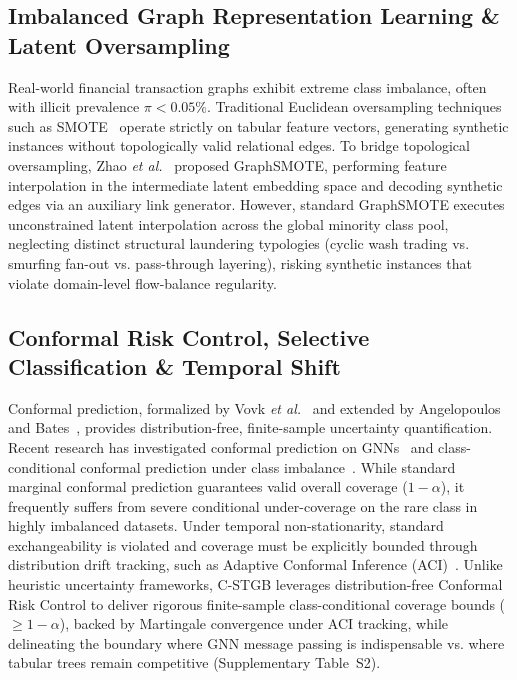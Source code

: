 \subsection{Imbalanced Graph Representation Learning \& Latent Oversampling}
Real-world financial transaction graphs exhibit extreme class imbalance, often with illicit prevalence $\pi < 0.05\%$. Traditional Euclidean oversampling techniques such as SMOTE~\cite{chawla2002smote} operate strictly on tabular feature vectors, generating synthetic instances without topologically valid relational edges. To bridge topological oversampling, Zhao \textit{et al.}~\cite{zhao2021graphsmote} proposed GraphSMOTE, performing feature interpolation in the intermediate latent embedding space and decoding synthetic edges via an auxiliary link generator. However, standard GraphSMOTE executes unconstrained latent interpolation across the global minority class pool, neglecting distinct structural laundering typologies (cyclic wash trading vs. smurfing fan-out vs. pass-through layering), risking synthetic instances that violate domain-level flow-balance regularity.

\subsection{Conformal Risk Control, Selective Classification \& Temporal Shift}
Conformal prediction, formalized by Vovk \textit{et al.}~\cite{vovk2005algorithmic} and extended by Angelopoulos and Bates~\cite{angelopoulos2021gentle, bates2021distribution}, provides distribution-free, finite-sample uncertainty quantification. Recent research has investigated conformal prediction on GNNs~\cite{huang2024conformal} and class-conditional conformal prediction under class imbalance~\cite{ding2023class}. While standard marginal conformal prediction guarantees valid overall coverage ($1-\alpha$), it frequently suffers from severe conditional under-coverage on the rare class in highly imbalanced datasets. Under temporal non-stationarity, standard exchangeability is violated and coverage must be explicitly bounded through distribution drift tracking, such as Adaptive Conformal Inference (ACI)~\cite{gibbs2021adaptive}. Unlike heuristic uncertainty frameworks, C-STGB leverages distribution-free Conformal Risk Control to deliver rigorous finite-sample class-conditional coverage bounds ($\ge 1 - \alpha$), backed by Martingale convergence under ACI tracking, while delineating the boundary where GNN message passing is indispensable vs. where tabular trees remain competitive (Supplementary Table~S2).
